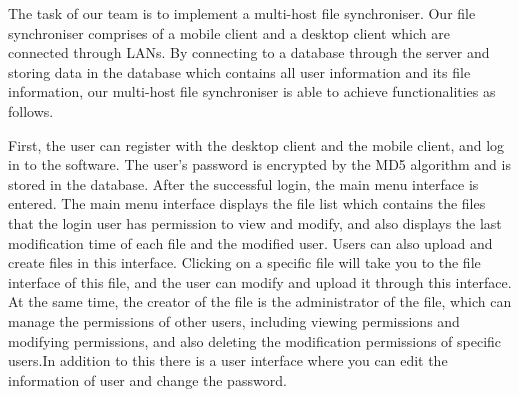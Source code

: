 

\noindent The task of our team is to implement a multi-host file synchroniser. Our file synchroniser comprises of a mobile client and a desktop client which are connected through LANs. By connecting to a database through the server and storing data in the database which contains all user information and its file information, our multi-host file synchroniser is able to achieve functionalities as follows.



\vspace{0.3cm}
\noindent First, the user can register with the desktop client and the mobile client, and log in to the software. The user's password is encrypted by the MD5 algorithm and is stored in the database. After the successful login, the main menu interface is entered. The main menu interface displays the file list which contains the files that the login user has permission to view and modify, and also displays the last modification time of each file and the modified user. Users can also upload and create files in this interface. Clicking on a specific file will take you to the file interface of this file, and the user can modify and upload it through this interface. At the same time, the creator of the file is the administrator of the file, which can manage the permissions of other users, including viewing permissions and modifying permissions, and also deleting the modification permissions of specific users.In addition to this there is a user interface where you can edit the information of user and change the password.

 
